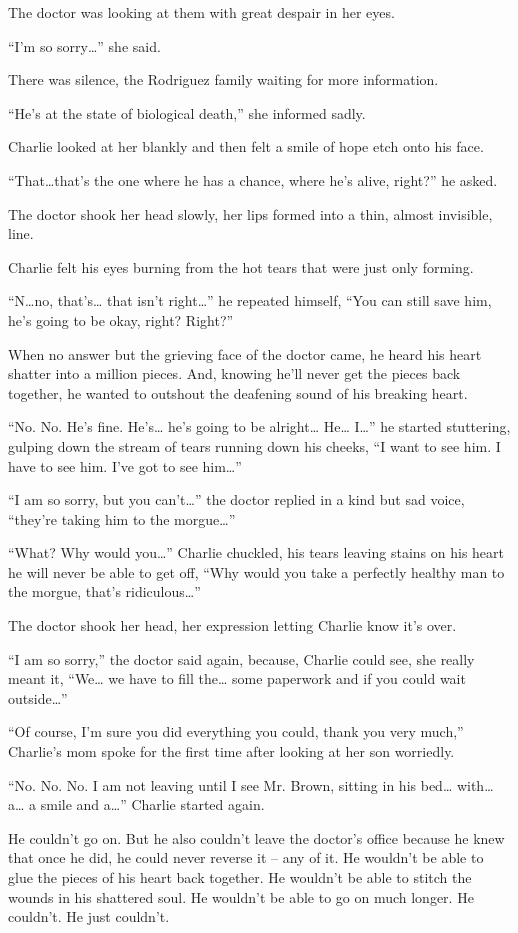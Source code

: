 The doctor was looking at them with great despair in her eyes.

“I’m so sorry…” she said.

There was silence, the Rodriguez family waiting for more information.

“He’s at the state of biological death,” she informed sadly.

Charlie looked at her blankly and then felt a smile of hope etch onto his face.

“That…that’s the one where he has a chance, where he’s alive, right?” he asked.

The doctor shook her head slowly, her lips formed into a thin, almost invisible, line.

Charlie felt his eyes burning from the hot tears that were just only forming.

“N…no, that’s… that isn’t right…” he repeated himself, “You can still save him, he’s going to be okay, right? Right?”

When no answer but the grieving face of the doctor came, he heard his heart shatter into a million pieces. And, knowing he’ll never get the pieces back together, he wanted to outshout the deafening sound of his breaking heart.

“No. No. He’s fine. He’s… he’s going to be alright… He… I…” he started stuttering, gulping down the stream of tears running down his cheeks, “I want to see him. I have to see him. I’ve got to see him…”

“I am so sorry, but you can’t…” the doctor replied in a kind but sad voice, “they’re taking him to the morgue…”

“What? Why would you…” Charlie chuckled, his tears leaving stains on his heart he will never be able to get off, “Why would you take a perfectly healthy man to the morgue, that’s ridiculous…”

The doctor shook her head, her expression letting Charlie know it’s over.

“I am so sorry,” the doctor said again, because, Charlie could see, she really meant it, “We… we have to fill the… some paperwork and if you could wait outside…”

“Of course, I’m sure you did everything you could, thank you very much,” Charlie’s mom spoke for the first time after looking at her son worriedly.

“No. No. No. I am not leaving until I see Mr. Brown, sitting in his bed… with… a… a smile and a…” Charlie started again.

He couldn’t go on. But he also couldn’t leave the doctor’s office because he knew that once he did, he could never reverse it – any of it. He wouldn’t be able to glue the pieces of his heart back together. He wouldn’t be able to stitch the wounds in his shattered soul. He wouldn’t be able to go on much longer. He couldn’t. He just couldn’t.

